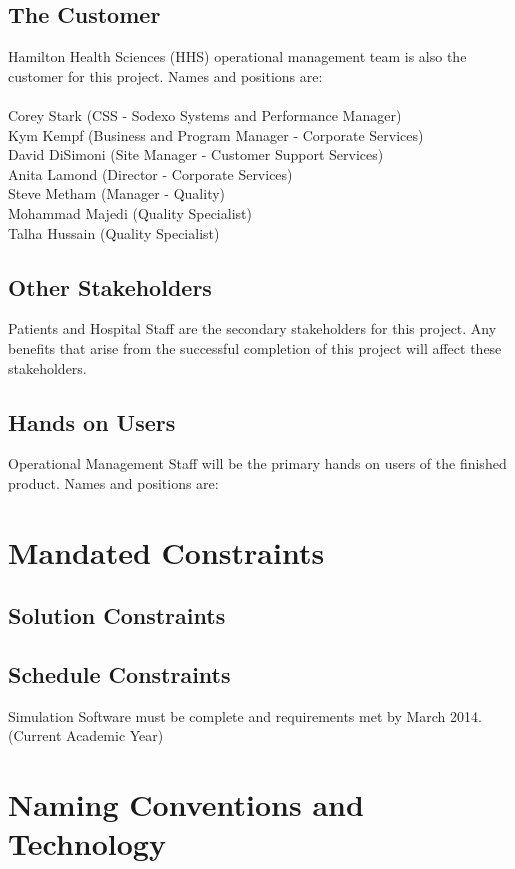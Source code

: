 \documentclass[paper=letter, fontsize=10pt]{scrartcl}
\numberwithin{equation}{section}		%
\numberwithin{figure}{section}			%
\numberwithin{table}{section}				%
\begin{document}
\subsection{The Customer}
Hamilton Health Sciences (HHS) operational management team is also the customer for this project. Names and positions are:\\ \\
Corey Stark (CSS - Sodexo Systems and Performance Manager)\\
Kym Kempf (Business and Program Manager - Corporate Services)\\
David DiSimoni (Site Manager - Customer Support Services)\\
Anita Lamond (Director - Corporate Services)\\
Steve Metham (Manager - Quality)\\
Mohammad Majedi (Quality Specialist)\\
Talha Hussain (Quality Specialist)

\subsection{Other Stakeholders}
Patients and Hospital Staff are the secondary stakeholders for this project. Any benefits that arise from the successful completion of this project will affect these stakeholders.
\subsection{Hands on Users}
Operational Management Staff will be the primary hands on users of the finished product. Names and positions are:

\section{Mandated Constraints}
\subsection{Solution Constraints}

\subsection{Schedule Constraints}
Simulation Software must be complete and requirements met by March 2014. (Current Academic Year)  


\section{Naming Conventions and Technology}
\end{document}
